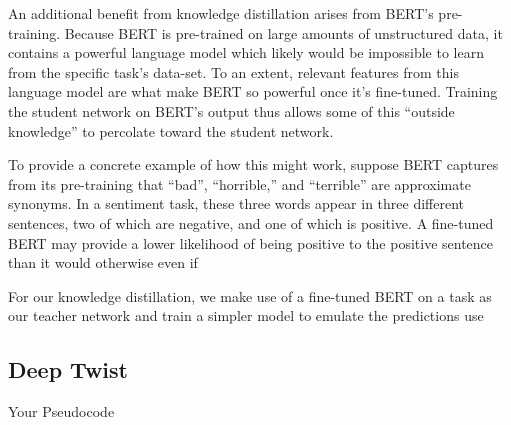 \documentclass[10pt]{article}
\begin{document}
An additional benefit from knowledge distillation arises from BERT's
pre-training. Because BERT is pre-trained on large amounts of unstructured
data, it contains a powerful language model which likely would be impossible
to learn from the specific task's data-set. To an extent, relevant features
from this language model are what make BERT so powerful once it's fine-tuned.
Training the student network on BERT's output thus allows some of this
``outside knowledge'' to percolate toward the student network.

To provide a concrete example of how this might work, suppose BERT captures
from its pre-training that ``bad'', ``horrible,'' and ``terrible'' are
approximate synonyms. In a sentiment task, these three words appear in three
different sentences, two of which are negative, and one of which is positive.
A fine-tuned BERT may provide a lower likelihood of being positive to the
positive sentence than it would otherwise even if



For our knowledge distillation, we make use of a fine-tuned BERT on a task as
our teacher network and train a simpler model to emulate the predictions use



\subsection{Deep Twist}



\begin{comment}
\begin{itemize}
\item How do you plan on training your parameters / inferring the
  states of your latent variables (MLE / MAP / Backprop / VI / EM / BP / ...)

\item What are the assumptions implicit in this technique? Is it an
approximation or exact? If it is an approximation what bound does it optimize?

\item What is the explicit method / algorithm that you derive for learning these
parameters?
\end{itemize}
\end{comment}

\begin{algorithm}
  \begin{algorithmic}
    \STATE{}
  \end{algorithmic}
  \caption{Your Pseudocode}
\end{algorithm}
\end{document}

